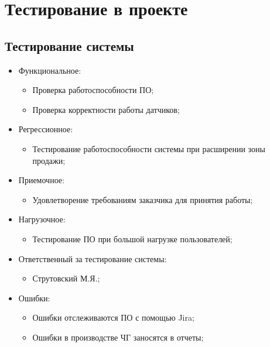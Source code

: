 \documentclass[a4paper,10pt]{article}
\begin{document}
\section{Тестирование в проекте}

    \subsection{Тестирование системы}

        \begin{itemize}
            \item Функциональное:
                \begin{itemize}
                \item Проверка работоспособности ПО;
                \item Проверка корректности работы датчиков;
                \end{itemize}
            \item Регрессионное:
                \begin{itemize}
                    \item Тестирование работоспособности системы при расширении зоны продажи;
                \end{itemize}

            \item Приемочное:
                \begin{itemize}
                    \item Удовлетворение требованиям заказчика для принятия работы;
                \end{itemize}

            \item Нагрузочное:
                \begin{itemize}
                    \item Тестирование ПО при большой нагрузке пользователей;
                \end{itemize}

            \item Ответственный за тестирование системы:
                \begin{itemize}
                    \item Струтовский М.Я.;
                \end{itemize}
            \item Ошибки:
                \begin{itemize}
                    \item Ошибки отслеживаются ПО с помощью Jira;
                    \item Ошибки в производстве ЧГ заносятся в отчеты;
                \end{itemize}

        \end{itemize}
\end{document}
